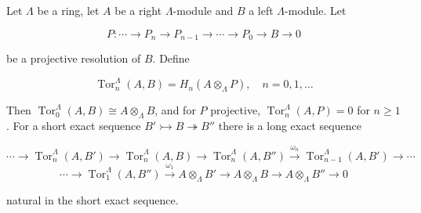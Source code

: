 Let $\Lambda$ be a ring, let $A$ be a right $\Lambda$-module and $B$ a left $\Lambda$-module. Let

$$P : \cdots \rightarrow P_n \rightarrow P_{n-1} \rightarrow \cdots \rightarrow P_0 \rightarrow B \rightarrow 0$$

be a projective resolution of $B$. Define

$$\operatorname{Tor}_n^\Lambda(A, B) = H_n(A \otimes_\Lambda P), \quad n = 0, 1, \dots$$

Then $\operatorname{Tor}_0^\Lambda(A, B) \cong A \otimes_\Lambda B$, and for $P$ projective, $\operatorname{Tor}_n^\Lambda(A, P) = 0$ for $n \geq 1$. For a short exact sequence $B' \rightarrowtail B \twoheadrightarrow B''$ there is a long exact sequence

$$\cdots \rightarrow \operatorname{Tor}_n^\Lambda(A, B') \rightarrow \operatorname{Tor}_n^\Lambda(A, B) \rightarrow \operatorname{Tor}_n^\Lambda(A, B'') \xrightarrow{\omega_n} \operatorname{Tor}_{n-1}^\Lambda(A, B') \rightarrow \cdots$$
$$\cdots \rightarrow \operatorname{Tor}_1^\Lambda(A, B'') \xrightarrow{\omega_1} A \otimes_\Lambda B' \rightarrow A \otimes_\Lambda B \rightarrow A \otimes_\Lambda B'' \rightarrow 0$$

natural in the short exact sequence.
